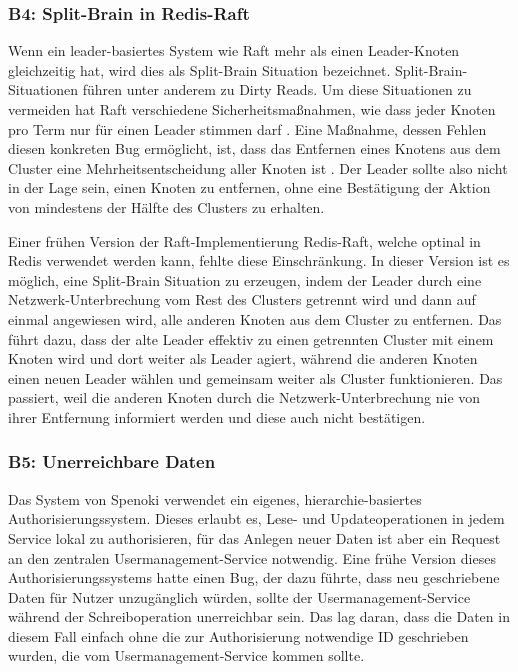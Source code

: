 \documentclass[12pt,a4paper]{report}
\begin{document}
\subsubsection{B4: Split-Brain in Redis-Raft}
Wenn ein leader-basiertes System wie Raft mehr als einen Leader-Knoten gleichzeitig hat, wird dies als Split-Brain Situation
bezeichnet. Split-Brain-Situationen führen unter anderem zu Dirty Reads. Um diese Situationen zu vermeiden hat Raft verschiedene
Sicherheitsmaßnahmen, wie dass jeder Knoten pro Term nur für einen Leader stimmen darf \cite{raft_original_paper}. Eine Maßnahme,
dessen Fehlen diesen konkreten Bug ermöglicht, ist, dass das Entfernen eines Knotens aus dem Cluster eine Mehrheitsentscheidung
aller Knoten ist \cite{jepsen_redis_raft}. Der Leader sollte also nicht in der Lage sein, einen Knoten zu entfernen, ohne eine
Bestätigung der Aktion von mindestens der Hälfte des Clusters zu erhalten.

Einer frühen Version der Raft-Implementierung Redis-Raft, welche optinal in Redis verwendet werden kann, fehlte diese
Einschränkung. In dieser Version ist es möglich, eine Split-Brain Situation zu erzeugen, indem der Leader durch eine
Netzwerk-Unterbrechung vom Rest des Clusters getrennt wird und dann auf einmal angewiesen wird, alle anderen Knoten aus dem
Cluster zu entfernen. Das führt dazu, dass der alte Leader effektiv zu einen getrennten Cluster mit einem Knoten wird und dort
weiter als Leader agiert, während die anderen Knoten einen neuen Leader wählen und gemeinsam weiter als Cluster funktionieren. Das
passiert, weil die anderen Knoten durch die Netzwerk-Unterbrechung nie von ihrer Entfernung informiert werden und diese auch nicht
bestätigen. \cite{jepsen_redis_raft}

\subsubsection{B5: Unerreichbare Daten}
Das System von Spenoki verwendet ein eigenes, hierarchie-basiertes Authorisierungssystem. Dieses erlaubt es, Lese- und
Updateoperationen in jedem Service lokal zu authorisieren, für das Anlegen neuer Daten ist aber ein Request an den zentralen
Usermanagement-Service notwendig. Eine frühe Version dieses Authorisierungssystems hatte einen Bug, der dazu führte, dass neu
geschriebene Daten für Nutzer unzugänglich würden, sollte der Usermanagement-Service während der Schreiboperation unerreichbar
sein. Das lag daran, dass die Daten in diesem Fall einfach ohne die zur Authorisierung notwendige ID geschrieben wurden, die vom
Usermanagement-Service kommen sollte.
\end{document}
